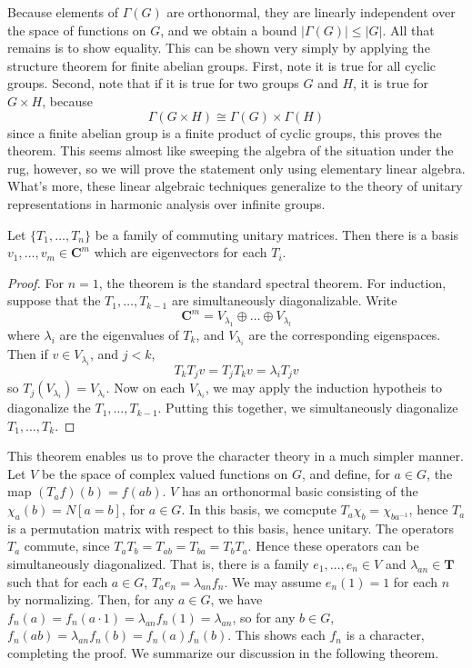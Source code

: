 Because elements of $\Gamma(G)$ are orthonormal, they are linearly independent over the space of functions on $G$, and we obtain a bound $|\Gamma(G)| \leq |G|$. All that remains is to show equality. This can be shown very simply by applying the structure theorem for finite abelian groups. First, note it is true for all cyclic groups. Second, note that if it is true for two groups $G$ and $H$, it is true for $G \times H$, because
%
\[ \Gamma(G \times H) \cong \Gamma(G) \times \Gamma(H) \]
%
since a finite abelian group is a finite product of cyclic groups, this proves the theorem. This seems almost like sweeping the algebra of the situation under the rug, however, so we will prove the statement only using elementary linear algebra. What's more, these linear algebraic techniques generalize to the theory of unitary representations in harmonic analysis over infinite groups.

\begin{theorem}
    Let $\{ T_1, \dots, T_n \}$ be a family of commuting unitary matrices. Then there is a basis $v_1, \dots, v_m \in \mathbf{C}^m$ which are eigenvectors for each $T_i$.
\end{theorem}
\begin{proof}
    For $n = 1$, the theorem is the standard spectral theorem. For induction, suppose that the $T_1, \dots, T_{k-1}$ are simultaneously diagonalizable. Write
    \[ \mathbf{C}^m = V_{\lambda_1} \oplus \dots \oplus V_{\lambda_l} \]
    where $\lambda_i$ are the eigenvalues of $T_k$, and $V_{\lambda_i}$ are the corresponding eigenspaces. Then if $v \in V_{\lambda_i}$, and $j < k$,
    \[ T_k T_j v = T_j T_k v = \lambda_i T_j v \]
    so $T_j(V_{\lambda_i}) = V_{\lambda_i}$. Now on each $V_{\lambda_i}$, we may apply the induction hypotheis to diagonalize the $T_1, \dots, T_{k-1}$. Putting this together, we simultaneously diagonalize $T_1, \dots, T_k$.
\end{proof}

This theorem enables us to prove the character theory in a much simpler manner. Let $V$ be the space of complex valued functions on $G$, and define, for $a \in G$, the map $(T_a f)(b) = f(ab)$. $V$ has an orthonormal basic consisting of the $\chi_a(b) = N [a = b]$, for $a \in G$. In this basis, we comcpute $T_a \chi_b = \chi_{ba^{-1}}$, hence $T_a$ is a permutation matrix with respect to this basis, hence unitary. The operators $T_a$ commute, since $T_aT_b = T_{ab} = T_{ba} = T_b T_a$. Hence these operators can be simultaneously diagonalized. That is, there is a family $e_1, \dots, e_n \in V$ and $\lambda_{an} \in \mathbf{T}$ such that for each $a \in G$, $T_a e_n = \lambda_{an} f_n$. We may assume $e_n(1) = 1$ for each $n$ by normalizing. Then, for any $a \in G$, we have $f_n(a) = f_n(a \cdot 1) = \lambda_{an} f_n(1) = \lambda_{an}$, so for any $b \in G$, $f_n(ab) = \lambda_{an} f_n(b) = f_n(a) f_n(b)$. This shows each $f_n$ is a character, completing the proof. We summarize our discussion in the following theorem.

